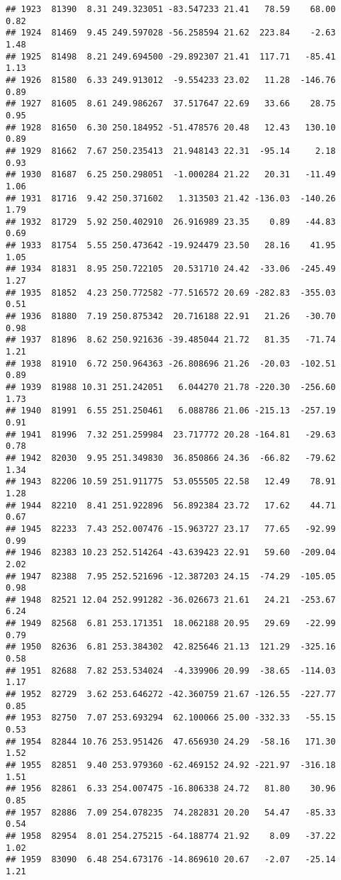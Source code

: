 \documentclass[]{article}
\begin{document}
\begin{verbatim}
## 1923  81390  8.31 249.323051 -83.547233 21.41   78.59    68.00  0.82
## 1924  81469  9.45 249.597028 -56.258594 21.62  223.84    -2.63  1.48
## 1925  81498  8.21 249.694500 -29.892307 21.41  117.71   -85.41  1.13
## 1926  81580  6.33 249.913012  -9.554233 23.02   11.28  -146.76  0.89
## 1927  81605  8.61 249.986267  37.517647 22.69   33.66    28.75  0.95
## 1928  81650  6.30 250.184952 -51.478576 20.48   12.43   130.10  0.89
## 1929  81662  7.67 250.235413  21.948143 22.31  -95.14     2.18  0.93
## 1930  81687  6.25 250.298051  -1.000284 21.22   20.31   -11.49  1.06
## 1931  81716  9.42 250.371602   1.313503 21.42 -136.03  -140.26  1.79
## 1932  81729  5.92 250.402910  26.916989 23.35    0.89   -44.83  0.69
## 1933  81754  5.55 250.473642 -19.924479 23.50   28.16    41.95  1.05
## 1934  81831  8.95 250.722105  20.531710 24.42  -33.06  -245.49  1.27
## 1935  81852  4.23 250.772582 -77.516572 20.69 -282.83  -355.03  0.51
## 1936  81880  7.19 250.875342  20.716188 22.91   21.26   -30.70  0.98
## 1937  81896  8.62 250.921636 -39.485044 21.72   81.35   -71.74  1.21
## 1938  81910  6.72 250.964363 -26.808696 21.26  -20.03  -102.51  0.89
## 1939  81988 10.31 251.242051   6.044270 21.78 -220.30  -256.60  1.73
## 1940  81991  6.55 251.250461   6.088786 21.06 -215.13  -257.19  0.91
## 1941  81996  7.32 251.259984  23.717772 20.28 -164.81   -29.63  0.78
## 1942  82030  9.95 251.349830  36.850866 24.36  -66.82   -79.62  1.34
## 1943  82206 10.59 251.911775  53.055505 22.58   12.49    78.91  1.28
## 1944  82210  8.41 251.922896  56.892384 23.72   17.62    44.71  0.67
## 1945  82233  7.43 252.007476 -15.963727 23.17   77.65   -92.99  0.99
## 1946  82383 10.23 252.514264 -43.639423 22.91   59.60  -209.04  2.02
## 1947  82388  7.95 252.521696 -12.387203 24.15  -74.29  -105.05  0.98
## 1948  82521 12.04 252.991282 -36.026673 21.61   24.21  -253.67  6.24
## 1949  82568  6.81 253.171351  18.062188 20.95   29.69   -22.99  0.79
## 1950  82636  6.81 253.384302  42.825646 21.13  121.29  -325.16  0.58
## 1951  82688  7.82 253.534024  -4.339906 20.99  -38.65  -114.03  1.17
## 1952  82729  3.62 253.646272 -42.360759 21.67 -126.55  -227.77  0.85
## 1953  82750  7.07 253.693294  62.100066 25.00 -332.33   -55.15  0.53
## 1954  82844 10.76 253.951426  47.656930 24.29  -58.16   171.30  1.52
## 1955  82851  9.40 253.979360 -62.469152 24.92 -221.97  -316.18  1.51
## 1956  82861  6.33 254.007475 -16.806338 24.72   81.80    30.96  0.85
## 1957  82886  7.09 254.078235  74.282831 20.20   54.47   -85.33  0.54
## 1958  82954  8.01 254.275215 -64.188774 21.92    8.09   -37.22  1.02
## 1959  83090  6.48 254.673176 -14.869610 20.67   -2.07   -25.14  1.21

\end{verbatim}
\end{document}
